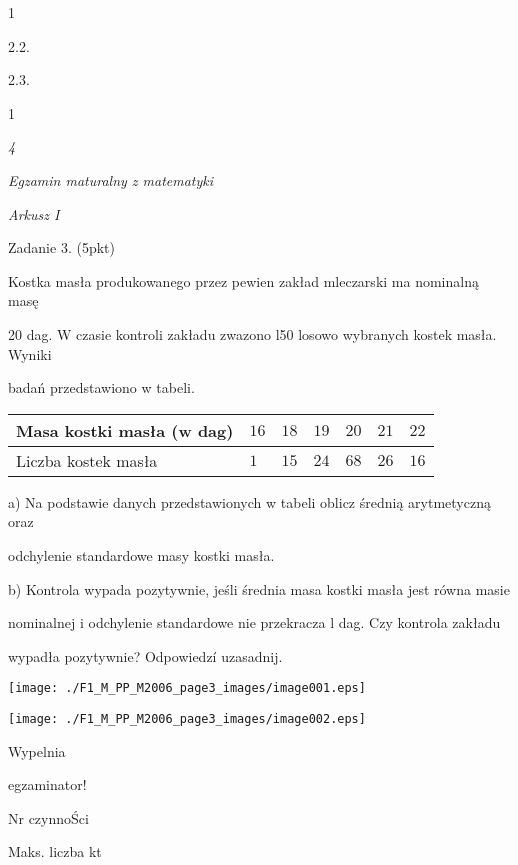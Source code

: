 \documentclass[a4paper,12pt]{article}
\begin{document}
1

2.2.

2.3.

1





{\it 4}

{\it Egzamin maturalny z matematyki}

{\it Arkusz I}

Zadanie 3. (5pkt)

Kostka masła produkowanego przez pewien zakład mleczarski ma nominalną masę

20 dag. W czasie kontroli zakładu zwazono l50 losowo wybranych kostek masła. Wyniki

badań przedstawiono w tabeli.
\begin{center}
\begin{tabular}{|l|l|l|l|l|l|l|}
\hline
\multicolumn{1}{|l|}{Masa kostki masła (w dag)}&	\multicolumn{1}{|l|}{$16$}&	\multicolumn{1}{|l|}{ $18$}&	\multicolumn{1}{|l|}{ $19$}&	\multicolumn{1}{|l|}{ $20$}&	\multicolumn{1}{|l|}{ $21$}&	\multicolumn{1}{|l|}{ $22$}	\\
\hline
\multicolumn{1}{|l|}{Liczba kostek masła}&	\multicolumn{1}{|l|}{$1$}&	\multicolumn{1}{|l|}{ $15$}&	\multicolumn{1}{|l|}{ $24$}&	\multicolumn{1}{|l|}{ $68$}&	\multicolumn{1}{|l|}{ $26$}&	\multicolumn{1}{|l|}{ $16$}	\\
\hline
\end{tabular}

\end{center}
a) Na podstawie danych przedstawionych w tabeli oblicz średnią arytmetyczną oraz

odchylenie standardowe masy kostki masła.

b) Kontrola wypada pozytywnie, jeśli średnia masa kostki masła jest równa masie

nominalnej i odchylenie standardowe nie przekracza l dag. Czy kontrola zakładu

wypadła pozytywnie? Odpowiedzí uzasadnij.
\begin{center}
\texttt{[image: ./F1\_M\_PP\_M2006\_page3\_images/image001.eps]}

\texttt{[image: ./F1\_M\_PP\_M2006\_page3\_images/image002.eps]}
\end{center}
Wypelnia

egzaminator!

Nr czynnoŚci

Maks. liczba kt
\end{document}
